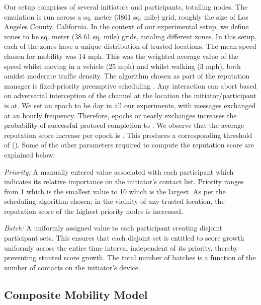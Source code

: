 \documentclass[letterpaper,twocolumn]{sig-alternate}
\begin{document}
\vspace{1mm}
 Our setup comprises of several initiators and participants, totalling  nodes. The emulation is run across a  sq. meter (3861 sq. mile) grid, roughly the size of Los Angeles County, California. In the context of our experimental setup, we define zones to be  sq. meter (38.61 sq. mile) grids, totaling  different zones. In this setup, each of the  zones have a unique distribution of trusted locations. The mean speed chosen for mobility was 14 mph. This was the weighted average value of the speed whilst moving in a vehicle (25 mph) and whilst walking (3 mph), both amidst moderate traffic density. The algorithm chosen as part of the reputation manager is fixed-priority preemptive scheduling \cite{audsley1995fixed}. Any interaction can abort based on adversarial interception of the channel at the location the initiator/participant is at. We set an epoch to be  day in all our experiments, with messages exchanged at an hourly frequency. Therefore,  epochs or nearly  exchanges increases the probability of successful protocol completion to . We observe that the average reputation score increase per epoch is . This produces a corresponding threshold of  (). Some of the other parameters required to compute the reputation score are explained below:

\vspace{1mm}
{\em Priority:} A manually entered value associated with each participant which indicates its relative importance on the initiator's contact list. Priority ranges from 1 which is the smallest value to 10 which is the largest. As per the scheduling algorithm chosen; in the vicinity of any trusted location, the reputation score of the highest priority nodes is increased.

\vspace{1mm}
{\em Batch:} A uniformly assigned value to each participant creating disjoint participant sets. This ensures that each disjoint set is entitled to score growth uniformly across the entire time interval independent of its priority, thereby preventing stunted score growth. The total number of batches is a function of the number of contacts on the initiator's device.
\vspace{1mm}

\subsection{Composite Mobility Model}
\label{composite}
\end{document}
